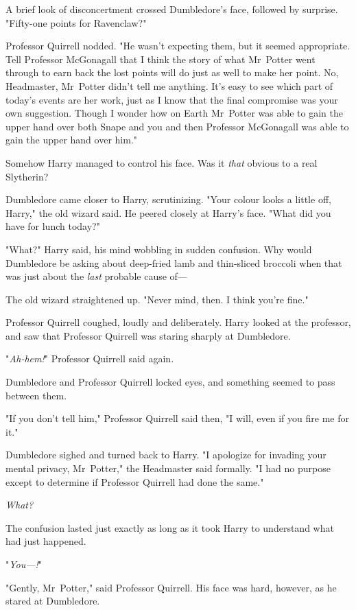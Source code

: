A brief look of disconcertment crossed Dumbledore's face, followed by surprise.
"Fifty-one points for Ravenclaw?"

Professor Quirrell nodded. "He wasn't expecting them, but it seemed
appropriate. Tell Professor McGonagall that I think the story of what
Mr~Potter went through to earn back the lost points will do just as well to
make her point. No, Headmaster, Mr~Potter didn't tell me anything. It's easy
to see which part of today's events are her work, just as I know that the final
compromise was your own suggestion. Though I wonder how on Earth Mr~Potter was
able to gain the upper hand over both Snape and you and then Professor
McGonagall was able to gain the upper hand over him."

Somehow Harry managed to control his face. Was it \emph{that} obvious to a real
Slytherin?

Dumbledore came closer to Harry, scrutinizing. "Your colour looks a little off,
Harry," the old wizard said. He peered closely at Harry's face. "What did you
have for lunch today?"

"What?" Harry said, his mind wobbling in sudden confusion. Why would Dumbledore
be asking about deep-fried lamb and thin-sliced broccoli when that was just
about the \emph{last} probable cause of---

The old wizard straightened up. "Never mind, then. I think you're fine."

Professor Quirrell coughed, loudly and deliberately. Harry looked at the
professor, and saw that Professor Quirrell was staring sharply at Dumbledore.

"\emph{Ah-hem!}" Professor Quirrell said again.

Dumbledore and Professor Quirrell locked eyes, and something seemed to pass
between them.

"If you don't tell him," Professor Quirrell said then, "I will, even if you
fire me for it."

Dumbledore sighed and turned back to Harry. "I apologize for invading your
mental privacy, Mr~Potter," the Headmaster said formally. "I had no purpose
except to determine if Professor Quirrell had done the same."

\emph{What?}

The confusion lasted just exactly as long as it took Harry to understand what
had just happened.

"\emph{You---!}"

"Gently, Mr~Potter," said Professor Quirrell. His face was hard, however, as
he stared at Dumbledore.

